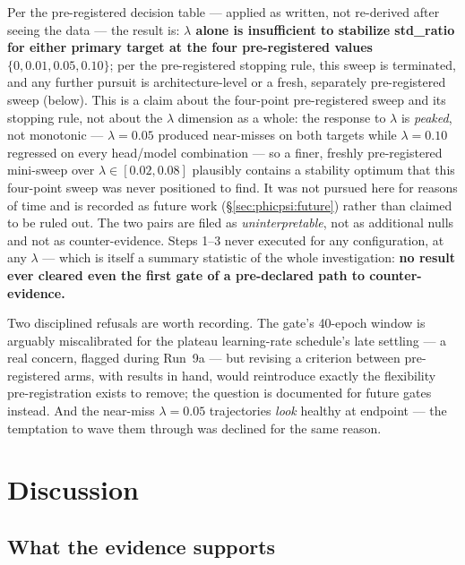 Per the pre-registered decision table --- applied as written, not re-derived after seeing the data --- the result is: \textbf{$\lambda$ alone is insufficient to stabilize std\_ratio for either primary target at the four pre-registered values $\{0, 0.01, 0.05, 0.10\}$}; per the pre-registered stopping rule, this sweep is terminated, and any further pursuit is architecture-level or a fresh, separately pre-registered sweep (below).
This is a claim about the four-point pre-registered sweep and its stopping rule, not about the $\lambda$ dimension as a whole: the response to $\lambda$ is \emph{peaked}, not monotonic --- $\lambda = 0.05$ produced near-misses on both targets while $\lambda = 0.10$ regressed on every head/model combination --- so a finer, freshly pre-registered mini-sweep over $\lambda \in [0.02, 0.08]$ plausibly contains a stability optimum that this four-point sweep was never positioned to find.
It was not pursued here for reasons of time and is recorded as future work (\S\ref{sec:phicpsi:future}) rather than claimed to be ruled out.
The two pairs are filed as \emph{uninterpretable}, not as additional nulls and not as counter-evidence.
Steps 1--3 never executed for any configuration, at any $\lambda$ --- which is itself a summary statistic of the whole investigation: \textbf{no result ever cleared even the first gate of a pre-declared path to counter-evidence.}

Two disciplined refusals are worth recording.
The gate's 40-epoch window is arguably miscalibrated for the plateau learning-rate schedule's late settling --- a real concern, flagged during Run~9a --- but revising a criterion between pre-registered arms, with results in hand, would reintroduce exactly the flexibility pre-registration exists to remove; the question is documented for future gates instead.
And the near-miss $\lambda = 0.05$ trajectories \emph{look} healthy at endpoint --- the temptation to wave them through was declined for the same reason.


\section{Discussion}
\label{sec:phicpsi:discussion}

\subsection{What the evidence supports}\label{subsec:what-the-evidence-supports}

